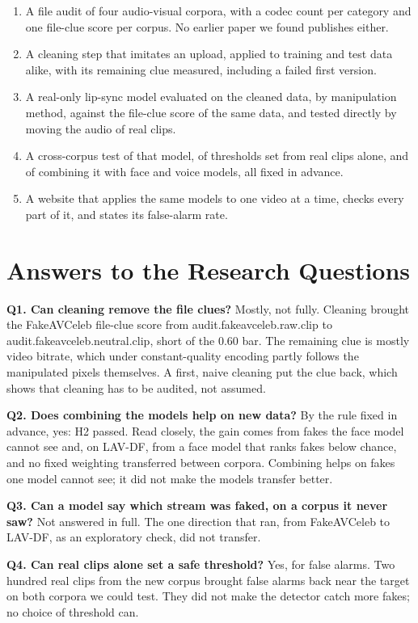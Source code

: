 \begin{enumerate}
    \item A file audit of four audio-visual corpora, with a codec count per
    category and one file-clue score per corpus. No earlier paper we found
    publishes either.
    \item A cleaning step that imitates an upload, applied to training and
    test data alike, with its remaining clue measured, including a failed
    first version.
    \item A real-only lip-sync model evaluated on the cleaned data, by
    manipulation method, against the file-clue score of the same data, and
    tested directly by moving the audio of real clips.
    \item A cross-corpus test of that model, of thresholds set from real clips
    alone, and of combining it with face and voice models, all fixed in
    advance.
    \item A website that applies the same models to one video at a time,
    checks every part of it, and states its false-alarm rate.
\end{enumerate}

\section{Answers to the Research Questions}

\textbf{Q1. Can cleaning remove the file clues?} Mostly, not fully. Cleaning
brought the FakeAVCeleb file-clue score from {{audit.fakeavceleb.raw.clip}} to
{{audit.fakeavceleb.neutral.clip}}, short of the 0.60 bar. The remaining clue
is mostly video bitrate, which under constant-quality encoding partly follows
the manipulated pixels themselves. A first, naive cleaning put the clue back,
which shows that cleaning has to be audited, not assumed.

\textbf{Q2. Does combining the models help on new data?} By the rule fixed in
advance, yes: H2 passed. Read closely, the gain comes from fakes the face
model cannot see and, on LAV-DF, from a face model that ranks fakes below
chance, and no fixed weighting transferred between corpora. Combining helps
on fakes one model cannot see; it did not make the models transfer better.

\textbf{Q3. Can a model say which stream was faked, on a corpus it never
saw?} Not answered in full. The one direction that ran, from FakeAVCeleb to
LAV-DF, as an exploratory check, did not transfer.

\textbf{Q4. Can real clips alone set a safe threshold?} Yes, for false alarms.
Two hundred real clips from the new corpus brought false alarms back near the
target on both corpora we could test. They did not make the detector catch
more fakes; no choice of threshold can.

